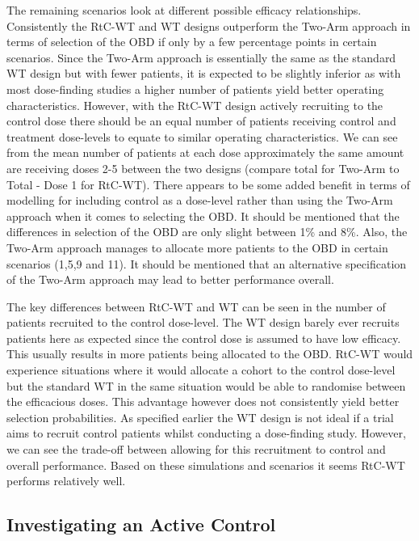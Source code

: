  The remaining scenarios look at different possible efficacy relationships. Consistently the RtC-WT and WT designs outperform the Two-Arm approach in terms of selection of the OBD if only by a few percentage points in certain scenarios. Since the Two-Arm approach is essentially the same as the standard WT design but with fewer patients, it is expected to be slightly inferior as with most dose-finding studies a higher number of patients yield better operating characteristics. However, with the RtC-WT design actively recruiting to the control dose there should be an equal number of patients receiving control and treatment dose-levels to equate to similar operating characteristics. We can see from the mean number of patients at each dose approximately the same amount are receiving doses 2-5 between the two designs (compare total for Two-Arm to Total - Dose 1 for RtC-WT). There appears to be some added benefit in terms of modelling for including control as a dose-level rather than using the Two-Arm approach when it comes to selecting the OBD. It should be mentioned that the differences in selection of the OBD are only slight between 1\% and 8\%. Also, the Two-Arm approach manages to allocate more patients to the OBD in certain scenarios (1,5,9 and 11). It should be mentioned that an alternative specification of the Two-Arm approach may lead to better performance overall. 
 
 The key differences between RtC-WT and WT can be seen in the number of patients recruited to the control dose-level. The WT design barely ever recruits patients here as expected since the control dose is assumed to have low efficacy. This usually results in more patients being allocated to the OBD. RtC-WT would experience situations where it would allocate a cohort to the control dose-level but the standard WT in the same situation would be able to randomise between the efficacious doses. This advantage however does not consistently yield better selection probabilities. As specified earlier the WT design is not ideal if a trial aims to recruit control patients whilst conducting a dose-finding study. However, we can see the trade-off between allowing for this recruitment to control and overall performance. Based on these simulations and scenarios it seems RtC-WT performs relatively well. 
 
   
 \subsection{Investigating an Active Control}
 \label{WT:InvesActiveCon}
 
